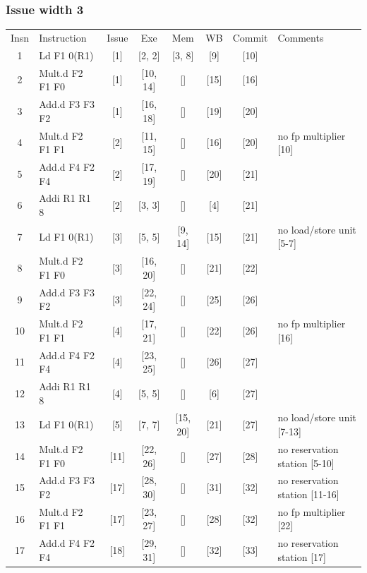 \documentclass[11pt]{article}
\begin{document}
\subsubsection*{Issue width 3}
\begin{center}
\scriptsize
\setlength{\tabcolsep}{8pt}
\renewcommand{\arraystretch}{1.35}
\begin{tabular}{clccccc>{\raggedright\arraybackslash}p{1.4in}}
Insn & Instruction & Issue & Exe & Mem & WB & Commit & Comments \\
1 & Ld F1 0(R1) & [1] & [2, 2] & [3, 8] & [9] & [10] &  \\
2 & Mult.d F2 F1 F0 & [1] & [10, 14] & [] & [15] & [16] &  \\
3 & Add.d F3 F3 F2 & [1] & [16, 18] & [] & [19] & [20] &  \\
4 & Mult.d F2 F1 F1 & [2] & [11, 15] & [] & [16] & [20] & no fp multiplier [10] \\
5 & Add.d F4 F2 F4 & [2] & [17, 19] & [] & [20] & [21] &  \\
6 & Addi R1 R1 8 & [2] & [3, 3] & [] & [4] & [21] &  \\
7 & Ld F1 0(R1) & [3] & [5, 5] & [9, 14] & [15] & [21] & no load/store unit [5-7] \\
8 & Mult.d F2 F1 F0 & [3] & [16, 20] & [] & [21] & [22] &  \\
9 & Add.d F3 F3 F2 & [3] & [22, 24] & [] & [25] & [26] &  \\
10 & Mult.d F2 F1 F1 & [4] & [17, 21] & [] & [22] & [26] & no fp multiplier [16] \\
11 & Add.d F4 F2 F4 & [4] & [23, 25] & [] & [26] & [27] &  \\
12 & Addi R1 R1 8 & [4] & [5, 5] & [] & [6] & [27] &  \\
13 & Ld F1 0(R1) & [5] & [7, 7] & [15, 20] & [21] & [27] & no load/store unit [7-13] \\
14 & Mult.d F2 F1 F0 & [11] & [22, 26] & [] & [27] & [28] & no reservation station [5-10] \\
15 & Add.d F3 F3 F2 & [17] & [28, 30] & [] & [31] & [32] & no reservation station [11-16] \\
16 & Mult.d F2 F1 F1 & [17] & [23, 27] & [] & [28] & [32] & no fp multiplier [22] \\
17 & Add.d F4 F2 F4 & [18] & [29, 31] & [] & [32] & [33] & no reservation station [17] \\
\end{tabular}
\end{center}
\end{document}
